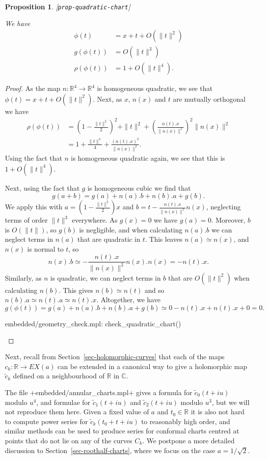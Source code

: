 \documentclass[reqno]{amsart}
\newcommand{\lbl}[1]{\label{#1}\textup{[\texttt{#1}]}\par}
\newcommand{\lbl}{\label}
\newcommand{\R}         {{\mathbb{R}}}
\newcommand{\C}         {{\mathbb{C}}}
\newcommand{\rt}        {\sqrt{2}}
\newcommand{\tc}	{\widetilde{c}}
\renewcommand{\:}{\colon}
\newtheorem{proposition}[theorem]{Proposition}
\theoremstyle{definition}
\begin{document}
\begin{proposition}\lbl{prop-quadratic-chart}
 We have
 \begin{align*}
  \phi(t) &= x + t + O(\|t\|^2) \\
  g(\phi(t)) &= O(\|t\|^3) \\
  \rho(\phi(t)) &= 1 + O(\|t\|^4).
 \end{align*}
\end{proposition}
\begin{proof}
 As the map $n\:\R^4\to\R^4$ is homogeneous quadratic, we see that
 $\phi(t)=x+t+O(\|t\|^2)$.  Next, as $x$, $n(x)$ and $t$ are mutually
 orthogonal we have
 \begin{align*}
  \rho(\phi(t)) &=
   \left(1 - \frac{\|t\|^2}{2}\right)^2 + \|t\|^2
               + \left(\frac{n(t).x}{\|n(x)\|^2}\right)^2\|n(x)\|^2 \\
   &= 1 + \frac{\|t\|^4}{4} + \frac{(n(t).x)^2}{\|n(x)\|^2}.
 \end{align*}
 Using the fact that $n$ is homogeneous quadratic again, we see that
 this is $1+O(\|t\|^4)$.

 Next, using the fact that $g$ is homogeneous cubic we find that
 \[ g(a+b) = g(a)+n(a).b + n(b).a + g(b). \]
 We apply this with $a=\left(1 - \frac{\|t\|^2}{2}\right)x$ and
 $b=t-\frac{n(t).x}{\|n(x)\|^2}n(x)$, neglecting terms of order
 $\|t\|^3$ everywhere.  As $g(x)=0$ we have $g(a)=0$.  Moreover, $b$
 is $O(\|t\|)$, so $g(b)$ is negligible, and when calculating $n(a).b$
 we can neglect terms in $n(a)$ that are quadratic in $t$.  This
 leaves $n(a)\simeq n(x)$, and $n(x)$ is normal to $t$, so
 \[ n(x).b \simeq -\frac{n(t).x}{\|n(x)\|^2} n(x).n(x) =
     -n(t).x.
 \]
 Similarly, as $n$ is quadratic, we can neglect terms in $b$ that are
 $O(\|t\|^2)$ when calculating $n(b)$.  This gives $n(b)\simeq n(t)$
 and so $n(b).a\simeq n(t).a\simeq n(t).x$.  Altogether, we have
 \[ g(\phi(t)) = g(a) + n(a).b + n(b).a + g(b) \simeq
     0 -n(t).x + n(t).x + 0 = 0.
 \]
 \begin{checks}
  embedded/geometry_check.mpl: check_quadratic_chart()
 \end{checks}
\end{proof}

Next, recall from Section~\ref{sec-holomorphic-curves} that each of
the maps $c_k\:\R\to EX(a)$ can be extended in a canonical way to give
a holomorphic map $\tc_k$ defined on a neighbourhood of $\R$ in $\C$.

The file \fname+embedded/annular_charts.mpl+ gives a formula for
$\tc_0(t+iu)$ modulo $u^4$, and formulae for $\tc_1(t+iu)$ and
$\tc_2(t+iu)$ modulo $u^3$, but we will not reproduce them here.
Given a fixed value of $a$ and $t_0\in\R$ it is also not hard to
compute power series for $\tc_k(t_0+t+iu)$ to reasonably high order,
and similar methods can be used to produce series for conformal charts
centred at points that do not lie on any of the curves $C_k$.  We
postpone a more detailed discussion to
Section~\ref{sec-roothalf-charts}, where we focus on the case
$a=1/\rt$.
\end{document}
